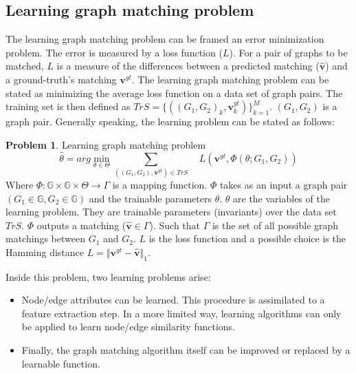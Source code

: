 \documentclass[times,onecolumn,final,authoryear]{article}
\theoremstyle{definition}
\newtheorem{problem}{Problem}
\begin{document}
\subsection{Learning graph matching problem}
\label{sec:subsec:learninggm}
The learning graph matching problem can be framed an error minimization problem. The error is measured by a loss function ($L$). For a pair of graphs to be matched, $L$ is a measure of the differences between a predicted matching ($\hat{\mathbf{v}}$) and a ground-truth's matching $\textbf{v}^{gt}$. The learning graph matching problem can be stated as minimizing the average loss function on a data set of graph pairs. The training set is then defined as $TrS=\{ ((G_1,G_2)_k,\textbf{v}^{gt}_k) \}_{k=1}^M$. $(G_1,G_2)$ is a graph pair. Generally speaking, the learning problem can be stated as follows:
\begin{problem}{Learning graph matching problem}
\begin{equation}
\hat{\theta}=arg \min_{\theta \in \Theta}  \sum_{ ((G_1,G_2),\textbf{v}^{gt}) \in TrS} \quad  L(\textbf{v}^{gt},\Phi(\theta;G_1,G_2))  
\end{equation}
Where $\Phi: \mathbb{G} \times \mathbb{G} \times \Theta \to \Gamma$ is a mapping function. $\Phi$ takes as an input a graph pair $(G_1 \in \mathbb{G}, G_2 \in \mathbb{G})$ and the trainable parameters $\theta$.  $\theta$ are the variables of the learning problem. They are trainable parameters (invariants) over the data set $TrS$. $\Phi$ outputs a matching ($\hat{\mathbf{v}} \in \Gamma$). Such that $\Gamma$ is the set of all possible graph matchings between $G_1$ and $G_2$.
$L$ is the loss function and a possible choice is the Hamming distance $L=\Vert \textbf{v}^{gt} - \hat{\textbf{v}} \Vert_1 $.  %
\label{prob:gmlearning}
\end{problem}
Inside this problem, two learning problems arise: 
\begin{itemize}
\item Node/edge attributes can be learned. This procedure is assimilated to a feature extraction step. In a more limited way, learning algorithms can only be applied to learn node/edge similarity functions.
\item Finally, the graph matching algorithm itself can be improved or replaced by a learnable function.
\end{itemize}
\end{document}
